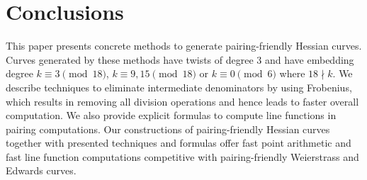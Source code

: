 \section{Conclusions}

This paper presents concrete methods to generate pairing-friendly Hessian curves.
Curves generated by these methods have twists of degree $3$ and
have embedding degree
$k \equiv 3 \pmod{18}$,
$k \equiv 9,15 \pmod{18}$ or
$k \equiv 0 \pmod{6}$ where $18 \nmid k$.
We describe techniques to eliminate intermediate denominators by using Frobenius,
which results in removing all division operations and hence leads to faster overall computation.
We also provide explicit formulas to compute line functions in pairing computations.
Our constructions of pairing-friendly Hessian curves together with presented techniques and formulas
offer fast point arithmetic and fast line function computations
competitive with pairing-friendly Weierstrass and Edwards curves.
